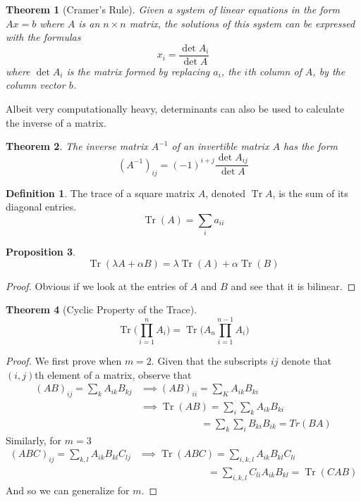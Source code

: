 \documentclass{article}
\DeclareMathOperator{\Tr}{Tr}
\newtheorem{theorem}{Theorem}[section]
\newtheorem{proposition}[theorem]{Proposition}
\theoremstyle{remark}
\theoremstyle{definition}
\newtheorem{definition}{Definition}[section]
\begin{document}
\begin{theorem}[Cramer's Rule]
Given a system of linear equations in the form $A x = b$ where $A$ is an $n \times n$ matrix, the solutions of this system can be expressed with the formulas 
\[ x_i = \frac{ \det{A_i}}{\det{A}}\]
where $\det{A_i}$ is the matrix formed by replacing $a_i$, the $i$th column of $A$, by the column vector $b$. 
\end{theorem}

Albeit very computationally heavy, determinants can also be used to calculate the inverse of a matrix. 

\begin{theorem}
The inverse matrix $A^{-1}$ of an invertible matrix $A$ has the form 
\[(A^{-1})_{i j} = (-1)^{i+j} \frac{\det{A_{i j}}}{\det{A}}\]
\end{theorem}

\begin{definition}
The trace of a square matrix $A$, denoted $\Tr{A}$, is the sum of its diagonal entries. 
\[\Tr(A) = \sum_{i} a_{ii}\]
\end{definition}

\begin{proposition}
\[\Tr(\lambda A + \alpha B) = \lambda \Tr(A) + \alpha \Tr(B)\]
\end{proposition}
\begin{proof}
Obvious if we look at the entries of $A$ and $B$ and see that it is bilinear.
\end{proof}

\begin{theorem}[Cyclic Property of the Trace]
\[\Tr{\bigg(\prod_{i=1}^n A_i\bigg)} = \Tr{\bigg(A_n \prod_{i=1}^{n-1} A_i\bigg)}\]
\end{theorem}
\begin{proof}
We first prove when $m=2$. Given that the subscripts $i j$ denote that $(i,j)$th element of a matrix, observe that
\begin{align*}
    (AB)_{ij} = \sum_{k} A_{ik} B_{kj} & \implies (AB)_{ii} = \sum_{K} A_{ik} B_{ki} \\
    & \implies \Tr(AB) = \sum_{i} \sum_{k} A_{ik} B_{ki} \\
    & \;\;\;\;\;\;\;\;\;\;\;\;\;\;\;\;\;\;\;\;\;\;= \sum_{k} \sum_{i} B_{ki} B_{ik} = Tr(BA)
\end{align*}
Similarly, for $m=3$
\begin{align*}
    (ABC)_{ij} = \sum_{k,l} A_{ik} B_{kl} C_{lj} & \implies \Tr(ABC) = \sum_{i,k,l} A_{ik} B_{kl} C_{li} \\ 
    & \;\;\;\;\;\;\;\;\;\;\;\;\;\;\;\;\;\;\;\;\;\;\;\;\;= \sum_{i,k,l} C_{li} A_{ik} B_{kl} = \Tr(CAB)
\end{align*}
And so we can generalize for $m$. 
\end{proof}
\end{document}
